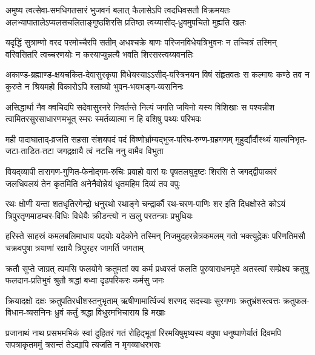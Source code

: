 \fourlineindentedshloka
{अमुष्य त्वत्सेवा-समधिगतसारं भुजवनं}
{बलात् कैलासेऽपि त्वदधिवसतौ विक्रमयतः}
{अलभ्यापातालेऽप्यलसचलिताङ्गुष्ठशिरसि}
{प्रतिष्ठा त्वय्यासीद्-ध्रुवमुपचितो मुह्यति खलः}%

\fourlineindentedshloka
{यदृद्धिं सुत्राम्णो वरद परमोच्चैरपि सतीम्}
{अधश्चक्रे बाणः परिजनविधेयत्रिभुवनः}
{न तच्चित्रं तस्मिन् वरिवसितरि त्वच्चरणयोः}
{न कस्याप्युन्नत्यै भवति शिरसस्त्वय्यवनतिः}%

\fourlineindentedshloka
{अकाण्ड-ब्रह्माण्ड-क्षयचकित-देवासुरकृपा}
{विधेयस्याऽऽसीद्-यस्त्रिनयन विषं संहृतवतः}
{स कल्माषः कण्ठे तव न कुरुते न श्रियमहो}
{विकारोऽपि श्लाघ्यो भुवन-भयभङ्ग-व्यसनिनः}%

\fourlineindentedshloka
{असिद्धार्था नैव क्वचिदपि सदेवासुरनरे}
{निवर्तन्ते नित्यं जगति जयिनो यस्य विशिखाः}
{स पश्यन्नीश त्वामितरसुरसाधारणमभूत्}
{स्मरः स्मर्तव्यात्मा न हि वशिषु पथ्यः परिभवः}%

\fourlineindentedshloka
{मही पादाघाताद्-व्रजति सहसा संशयपदं}
{पदं विष्णोर्भ्राम्यद्भुज-परिघ-रुग्ण-ग्रहगणम्}
{मुहुर्द्यौर्दौस्थ्यं यात्यनिभृत-जटा-ताडित-तटा}
{जगद्रक्षायै त्वं नटसि ननु वामैव विभुता}%

\fourlineindentedshloka
{वियद्‍व्यापी तारागण-गुणित-फेनोद्गम-रुचिः}
{प्रवाहो वारां यः पृषतलघुदृष्टः शिरसि ते}
{जगद्द्वीपाकारं जलधिवलयं तेन कृतमिति}
{अनेनैवोन्नेयं धृतमहिम दिव्यं तव वपुः}%

\fourlineindentedshloka
{रथः क्षोणी यन्ता शतधृतिरगेन्द्रो धनुरथो}
{रथाङ्गे चन्द्रार्कौ रथ-चरण-पाणिः शर इति}
{दिधक्षोस्ते कोऽयं त्रिपुरतृणमाडम्बर-विधिः}
{विधेयैः क्रीडन्त्यो न खलु परतन्त्राः प्रभुधियः}%

\fourlineindentedshloka
{हरिस्ते साहस्रं कमलबलिमाधाय पदयोः}
{यदेकोने तस्मिन् निजमुदहरन्नेत्रकमलम्}
{गतो भक्त्युद्रेकः परिणतिमसौ चक्रवपुषा}
{त्रयाणां रक्षायै त्रिपुरहर जागर्ति जगताम्}%

\fourlineindentedshloka
{क्रतौ सुप्ते जाग्रत् त्वमसि फलयोगे क्रतुमतां}
{क्व कर्म प्रध्वस्तं फलति पुरुषाराधनमृते}
{अतस्त्वां सम्प्रेक्ष्य क्रतुषु फलदान-प्रतिभुवं}
{श्रुतौ श्रद्धां बध्वा दृढपरिकरः कर्मसु जनः}%

\fourlineindentedshloka
{क्रियादक्षो दक्षः क्रतुपतिरधीशस्तनुभृताम्}
{ऋषीणामार्त्विज्यं शरणद सदस्याः सुरगणाः}
{क्रतुभ्रंशस्त्वत्तः क्रतुफल-विधान-व्यसनिनः}
{ध्रुवं कर्तुं श्रद्धा विधुरमभिचाराय हि मखाः}%

\fourlineindentedshloka
{प्रजानाथं नाथ प्रसभमभिकं स्वां दुहितरं}
{गतं रोहिद्भूतां रिरमयिषुमृष्यस्य वपुषा}
{धनुष्पाणेर्यातं दिवमपि सपत्राकृतममुं}
{त्रसन्तं तेऽद्यापि त्यजति न मृगव्याधरभसः}%

